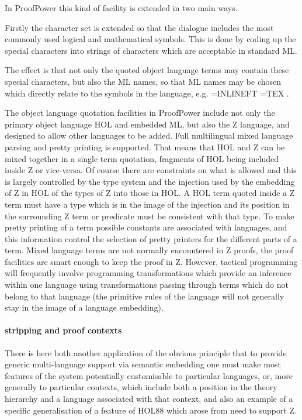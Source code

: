 \documentclass[10pt,titlepage]{book}
\def\Product{ProofPower}
\begin{document}
In {\Product} this kind of facility is extended in two main ways.

Firstly the character set is extended so that the dialogue includes the most commonly used logical and mathematical symbols.
This is done by coding up the special characters into strings of characters which are acceptable in standard ML.

The effect is that not only the quoted object language terms may contain these special characters, but also the ML names, so that ML names may be chosen which directly relate to the symbols in the language, e.g.
=INLINEFT
=TEX
.

The object language quotation facilities in {\Product} include not only the primary object language HOL and embedded ML, but also the Z language, and designed to allow other languages to be added.
Full multilingual mixed language parsing and pretty printing is supported.
That means that HOL and Z can be mixed together in a single term quotation, fragments of HOL being included inside Z or vice-versa.
Of course there are constraints on what is allowed and this is largely controlled by the type system and the injection used by the embedding of Z in HOL of the types of Z into those in HOL.
A HOL term quoted inside a Z term must have a type which is in the image of the injection and its position in the surrounding Z term or predicate must be consistent with that type.
To make pretty printing of a term possible constants are associated with languages, and this information control the selection of pretty printers for the different parts of a term.
Mixed language terms are not normally encountered in Z proofs, the proof facilities are smart enough to keep the proof in Z.
However, tactical programming will frequently involve programming transformations which provide an inference within one language using transformations passing through terms which do not belong to that language (the primitive rules of the language will not generally stay in the image of a language embedding).

\paragraph{stripping and proof contexts}

There is here both another application of the obvious principle that to provide generic multi-language support via semantic embedding one must make most features of the system potentially customisable to particular languages, or, more generally to particular contexts, which include both a position in the theory hierarchy and a language associated with that context, and also an example of a specific generalisation of a feature of HOL88 which arose from need to support Z.
\end{document}
